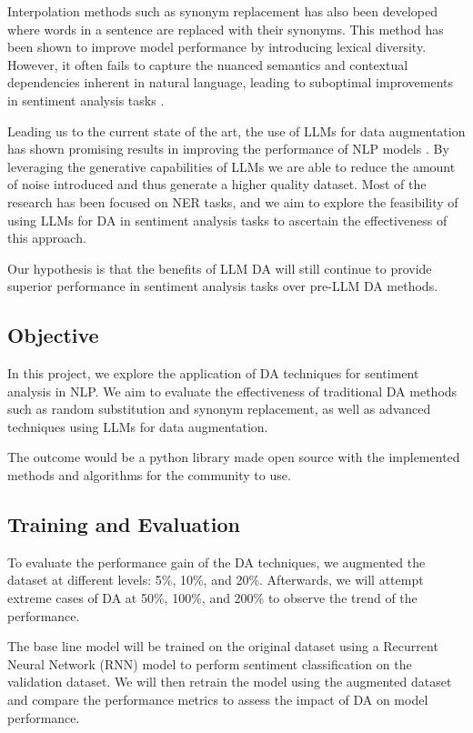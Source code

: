 \documentclass{article}
\begin{document}
Interpolation methods such as synonym replacement has also been developed
\cite{sahin-steedman-2018-data} where words in a sentence are replaced with
their synonyms. This method has been shown to improve model performance by
introducing lexical diversity. However, it often fails to capture the nuanced
semantics and contextual dependencies inherent in natural language, leading to
suboptimal improvements in sentiment analysis tasks
\cite{sahin-steedman-2018-data}.

Leading us to the current state of the art, the use of LLMs for data
augmentation has shown promising results in improving the performance of NLP
models \cite{ding-etal-2024-data}. By leveraging the generative capabilities of
LLMs we are able to reduce the amount of noise introduced and thus generate a
higher quality dataset. Most of the research has been focused on NER tasks, and
we aim to explore the feasibility of using LLMs for DA in sentiment analysis
tasks to ascertain the effectiveness of this approach.

Our hypothesis is that the benefits of LLM DA will still continue to provide
superior performance in sentiment analysis tasks over pre-LLM DA methods.

\subsection{Objective}

In this project, we explore the application of DA techniques for sentiment
analysis in NLP. We aim to evaluate the effectiveness of traditional DA methods
such as random substitution and synonym replacement, as well as advanced
techniques using LLMs for data augmentation.

The outcome would be a python library made open source with the implemented
methods and algorithms for the community to use.

\subsection{Training and Evaluation}

To evaluate the performance gain of the DA techniques, we augmented the dataset
at different levels: 5\%, 10\%, and 20\%. Afterwards, we will attempt extreme
cases of DA at 50\%, 100\%, and 200\% to observe the trend of the performance.

The base line model will be trained on the original dataset using a Recurrent
Neural Network (RNN) model to perform sentiment classification on the
validation dataset. We will then retrain the model using the augmented dataset
and compare the performance metrics to assess the impact of DA on model
performance.
\end{document}
